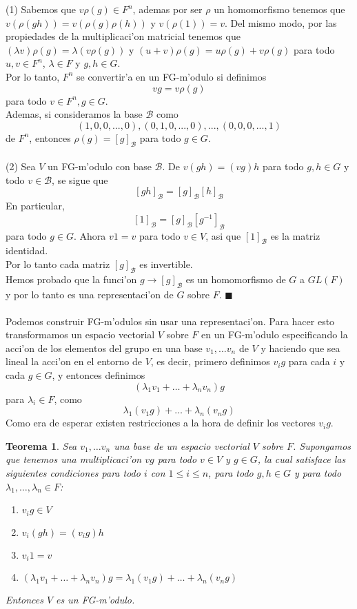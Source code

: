 \documentclass[a4paper,openright,12pt]{report}
\numberwithin{equation}{section} %
\newtheorem{teorema}{Teorema}[section] %
\newenvironment{proof}{\noindent{\it Demostracion:}}{\hfill$\blacksquare$} %
\begin{document}
\begin{proof}
(1) Sabemos que $v \rho (g) \in F^{n}$, ademas por ser $\rho$ un homomorfismo tenemos que $v (\rho (gh))=v(\rho (g) \rho (h))$ y $v (\rho (1))=v$. Del mismo modo, por las propiedades de la multiplicaci'on matricial tenemos que $(\lambda v)\rho(g)=\lambda (v \rho(g))$ y $(u +v)\rho (g)=u \rho(g) + v \rho (g)$ para todo $u, v \in F^{n}$, $\lambda \in F$ y $g, h \in G$.\\
Por lo tanto, $F^{n}$ se convertir'a en un FG-m'odulo si definimos
\[
vg=v \rho (g)
\]
para todo $v \in F^{n}, g \in G$.\\
Ademas, si consideramos la base $\mathscr{B}$ como
\[
(1, 0, 0, ..., 0), (0, 1, 0, ...,0), ..., (0, 0, 0, ... , 1)
\]
de $F^{n}$, entonces $\rho (g) = [g]_{\mathscr{B}}$ para todo $g \in G$.\\
\\
(2) Sea $V$ un FG-m'odulo con base $\mathscr{B}$. De $v(gh)=(vg)h$ para todo $g, h \in G$ y todo $v \in \mathscr{B}$, se sigue que 
\[
[gh]_{\mathscr{B}}=[g]_{\mathscr{B}}[h]_{\mathscr{B}}
\]
En particular, 
\[
[1]_{\mathscr{B}}=[g]_{\mathscr{B}}[g^{-1}]_{\mathscr{B}}
\]
para todo $g \in G$. Ahora $v1=v$ para todo $v \in V$, asi que $[1]_{\mathscr{B}}$ es la matriz identidad.\\
Por lo tanto cada matriz $[g]_{\mathscr{B}}$ es invertible.\\
Hemos probado que la funci'on $g \rightarrow [g]_{\mathscr{B}}$ es un homomorfismo de $G$ a $GL(F)$ y por lo tanto es una representaci'on de $G$ sobre $F$. 
\end{proof}\\
\\
Podemos construir FG-m'odulos sin usar una representaci'on. Para hacer esto transformamos un espacio vectorial $V$ sobre $F$ en un FG-m'odulo especificando la acci'on de los elementos del grupo en una base $v_{1}, \ldots v_{n}$ de $V$ y haciendo que sea lineal la acci'on en el entorno de $V$, es decir, primero definimos $v_{i}g$ para cada $i$ y cada $g \in G$, y entonces definimos
\[
(\lambda_{1}v_{1}+ \ldots +\lambda_{n}v_{n})g
\]
para $\lambda_{i} \in F$, como 
\[
\lambda_{1}(v_{1}g)+ \ldots +\lambda_{n}(v_{n}g)
\]
Como era de esperar existen restricciones a la hora de definir los vectores $v_{i}g$.
\begin{teorema}
Sea $v_{1}, \ldots v_{n}$ una base de un espacio vectorial $V$ sobre $F$. Supongamos que tenemos una multiplicaci'on $vg$ para todo $v \in V$ y $g \in G$, la cual satisface las siguientes condiciones para todo $i$ con $1 \leq i \leq n$, para todo $g, h \in G$ y para todo $\lambda_{1}, \ldots ,\lambda_{n} \in F$:
\begin{enumerate}
\item $v_{i}g \in V$
\item $v_{i}(gh)=(v_{i}g)h$
\item $v_{i}1=v$
\item $(\lambda_{1}v_{1}+ \ldots +\lambda_{n}v_{n})g=\lambda_{1}(v_{1}g)+ \ldots +\lambda_{n}(v_{n}g)$ 
\end{enumerate}
Entonces $V$ es un FG-m'odulo.
\end{teorema}
\end{document}
